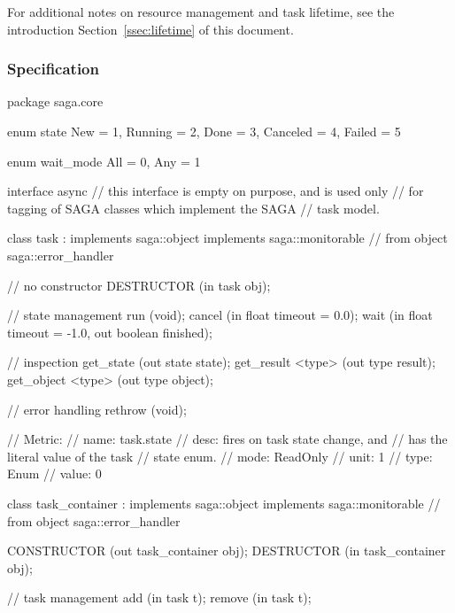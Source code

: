   For additional notes on resource management and task lifetime,
  see the introduction Section~\ref{ssec:lifetime} of this
  document.
 
 \subsubsection{Specification}
 
 \begin{myspec}
  package saga.core
  {
    enum state
    {
      New       =  1,
      Running   =  2,
      Done      =  3,
      Canceled  =  4,
      Failed    =  5
    }
 
 
    enum wait_mode
    {
      All       =  0,
      Any       =  1
    }
 
 
    interface async
    {
      // this interface is empty on purpose, and is used only
      // for tagging of SAGA classes which implement the SAGA
      // task model.
    }
 
 
    class task : implements   saga::object
                 implements   saga::monitorable
              // from object  saga::error_handler
    {
      // no constructor
      DESTRUCTOR       (in  task            obj);
 
      // state management
      run               (void);
      cancel            (in  float           timeout =  0.0);
      wait              (in  float           timeout = -1.0,
                         out boolean         finished);
 
      // inspection
      get_state         (out state           state);
      get_result <type> (out type            result);
      get_object <type> (out type            object);
 
      // error handling
      rethrow           (void);
 
      // Metric:
      //   name:  task.state
      //   desc:  fires on task state change, and
      //          has the literal value of the task
      //          state enum.
      //   mode:  ReadOnly
      //   unit:  1
      //   type:  Enum
      //   value: 0
    }
 
 
    class task_container : implements   saga::object
                           implements   saga::monitorable
                        // from object  saga::error_handler
    {
      CONSTRUCTOR      (out task_container  obj);
      DESTRUCTOR       (in  task_container  obj);
 
      // task management
      add               (in  task            t);
      remove            (in  task            t);
 
}}
\end{myspec}

